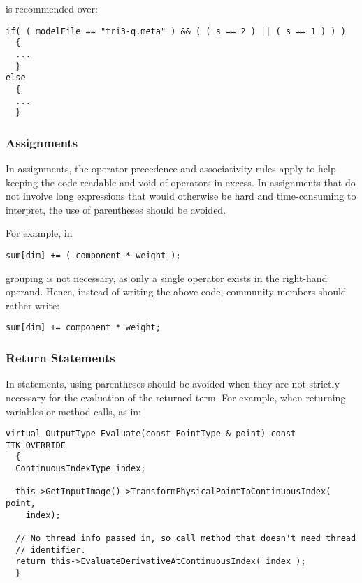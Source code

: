 is recommended over:

\small
\begin{verbatim}
if( ( modelFile == "tri3-q.meta" ) && ( ( s == 2 ) || ( s == 1 ) ) )
  {
  ...
  }
else
  {
  ...
  }
\end{verbatim}
\normalsize


\subsubsection{Assignments}
\label{subsubsec:Assignments}

In assignments, the operator precedence and associativity rules apply to help
keeping the code readable and void of operators in-excess. In assignments that
do not involve long expressions that would otherwise be hard and time-consuming
to interpret, the use of parentheses should be avoided.

For example, in

\small
\begin{verbatim}
sum[dim] += ( component * weight );
\end{verbatim}
\normalsize

grouping is not necessary, as only a single operator exists in the right-hand
operand. Hence, instead of writing the above code, community members should
rather write:

\small
\begin{verbatim}
sum[dim] += component * weight;
\end{verbatim}
\normalsize


\subsubsection{Return Statements}
\label{subsubsec:ReturnStatements}

In  statements, using parentheses should be avoided when they
are not strictly necessary for the evaluation of the returned term. For example,
when returning variables or method calls, as in:

\small
\begin{verbatim}
virtual OutputType Evaluate(const PointType & point) const ITK_OVERRIDE
  {
  ContinuousIndexType index;

  this->GetInputImage()->TransformPhysicalPointToContinuousIndex( point,
    index);

  // No thread info passed in, so call method that doesn't need thread
  // identifier.
  return this->EvaluateDerivativeAtContinuousIndex( index );
  }
\end{verbatim}
\normalsize

